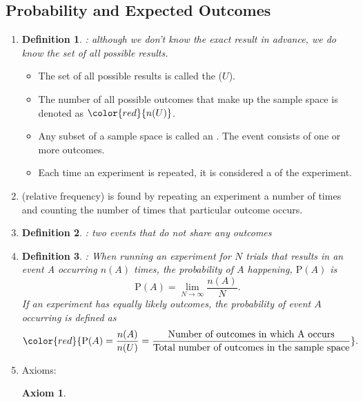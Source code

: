 \documentclass[12pt, a4paper]{article}
\newtheorem{definition}{Definition}[subsection]
\newtheorem{axiom}{Axiom}[subsection]
\def\P{\mathrm{P}}
\begin{document}
\subsection{Probability and Expected Outcomes}
\begin{enumerate}
    \item \begin{definition}\textbf{\color{red}{Random Events}}: although we don't know the exact result in advance, we do know the set of all possible results. \end{definition}
    \begin{itemize}
        \item The set of all possible results is called the \textbf{\color{red}{sample space}} ($U$). 
        \item The number of all possible outcomes that make up the sample space is denoted as ${\color{red}{n(U)}}$.
        \item Any subset of a sample space is called an \textbf{\color{red}{event}}. The event consists of one or more outcomes. 
        \item Each time an experiment is repeated, it is considered a \textbf{\color{red}{trial}} of the experiment. 
    \end{itemize}
    \item \textbf{\color{red}{Experimental probability}} (relative frequency) is found by repeating an experiment a number of times and counting the number of times that particular outcome occurs. 
    \item \begin{definition}\textbf{\color{red}{Mutually exclusive}}: two events that do not share any outcomes {\color{green}{$\rightarrow$ They cannot occur together.}}\end{definition}
    \item \begin{definition}\textbf{\color{red}{Theoretical probability}}: When running an experiment for $N$ trials that results in an event A occurring $n(A)$ times, the probability of $A$ happening, $\P(A)$ is $$\P(A)=\lim_{N\to\infty}\frac{n(A)}{N}.$$
    If an experiment has equally likely outcomes, the probability of event $A$ occurring is defined as $${\color{red}{\P(A)=\frac{n(A)}{n(U)}=\frac{\text{Number of outcomes in which A occurs}}{\text{Total number of outcomes in the sample space}}}}.$$\end{definition}
    \item Axioms:
    \begin{axiom}

\end{axiom}
\end{enumerate}
\end{document}
